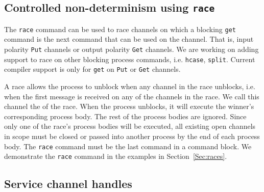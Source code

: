 \documentclass[11pt]{article}
\begin{document}
\subsection{Controlled non-determinism using {\tt race}}
\label{sec:race-command}

The \lstinline$race$ command can be used to race channels on which a blocking \lstinline$get$ command is the next command that can be used on the channel.
That is, input polarity \lstinline$Put$ channels or output polarity \lstinline$Get$ channels.
We are working on adding support to race on other blocking process commands, i.e. \lstinline$hcase$, \lstinline$split$. Current compiler support is only for \lstinline$get$ on \lstinline$Put$ or \lstinline$Get$ channels.

A race allows the process to unblock when any channel in the race unblocks, i.e. when the first message is received on any of the channels in the race.
We call this channel the  of the race.
When the process unblocks, it will execute the winner's corresponding process body.
The rest of the process bodies are ignored.
Since only one of the race's process bodies will be executed, all existing open channels in scope must be closed or passed into another process by the end of each process body.
The \lstinline$race$ command must be the last command in a command block.
We demonstrate the \lstinline$race$ command in the examples in Section~\ref{Sec:races}.



\subsection{Service channel handles}
\label{sec:servicehandles}
\end{document}
